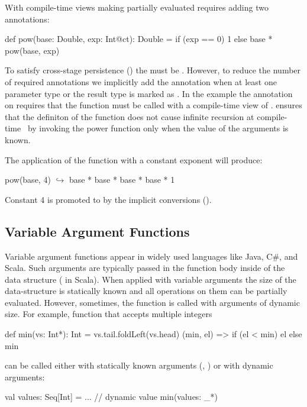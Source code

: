 With compile-time views making partially evaluated requires adding two annotations:

\begin{lstparagraph}
def pow(base: Double, exp: Int@ct): Double =
  if (exp == 0) 1 else base * pow(base, exp)
\end{lstparagraph}

To satisfy cross-stage persistence () the  must be .
However, to reduce the number of required annotations we implicitly add the  annotation
when at least one parameter type or the result type is marked as . In the example
 the  annotation on  requires that the function must be called with
 a compile-time view of . \tool ensures that the definiton of the  function
 does not cause infinite recursion at compile-time~\cite{} by invoking the power function
 only when the value of the  arguments is known.

 The application of the function  with a constant
 exponent will produce:

\begin{lstparagraph}
pow(base, 4)
  $\hookrightarrow$ base * base * base * base * 1
\end{lstparagraph}

Constant 4 is promoted to  by the implicit conversions ().

\subsection{Variable Argument Functions}
\label{sct:varargs}

Variable argument functions appear in widely used languages like Java, C\#, and Scala.
 Such arguments are typically passed in the function body inside of the data structure
 (\eg {} in Scala). When applied with variable arguments the size of the
 data-structure is statically known and all operations on them can be partially
 evaluated. However, sometimes, the function is called with arguments of dynamic size.
 For example, function  that accepts multiple integers\begin{lstparagraph}
def min(vs: Int*): Int = vs.tail.foldLeft(vs.head) {
  (min, el) => if (el < min) el else min
}
\end{lstparagraph}can be called either with statically known arguments
 (\eg, ) or with dynamic arguments:\begin{lstparagraph}
val values: Seq[Int] = ... // dynamic value
min(values: _*)
\end{lstparagraph}

